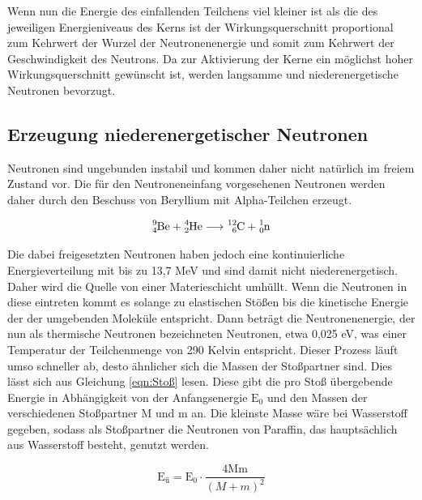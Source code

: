 \documentclass[titlepage = firstcover]{scrartcl}
\begin{document}
                \noindent
                Wenn nun die Energie des einfallenden Teilchens viel kleiner ist als die des jeweiligen Energieniveaus des Kerns ist der Wirkungsquerschnitt proportional zum Kehrwert der Wurzel der
                Neutronenenergie und somit zum Kehrwert der Geschwindigkeit des Neutrons. Da zur Aktivierung der Kerne ein möglichst hoher Wirkungsquerschnitt gewünscht ist, werden langsamme und
                niederenergetische Neutronen bevorzugt.

        
        \subsection{Erzeugung niederenergetischer Neutronen}
            Neutronen sind ungebunden instabil und kommen daher nicht natürlich im freiem Zustand vor. Die für den Neutroneneinfang vorgesehenen Neutronen werden daher durch den Beschuss von 
            Beryllium mit Alpha-Teilchen erzeugt.

            \begin{equation*}
                \ce{^{9}_{4}Be} + \ce{^{4}_{2}He} \longrightarrow \ce{^{12}_{6}C} + \ce{^{1}_{0}n}
            \end{equation*}

            \noindent
            Die dabei freigesetzten Neutronen haben jedoch eine kontinuierliche Energieverteilung mit bis zu 13,7 MeV und sind damit nicht niederenergetisch. Daher wird die Quelle von einer 
            Materieschicht umhüllt. Wenn die Neutronen in diese eintreten kommt es solange zu elastischen Stößen bis die kinetische Energie der der umgebenden Moleküle entspricht. Dann beträgt
            die Neutronenenergie, der nun als thermische Neutronen bezeichneten Neutronen, etwa 0,025 eV, was einer Temperatur der Teilchenmenge von 290 Kelvin entspricht. Dieser Prozess läuft 
            umso schneller ab, desto ähnlicher sich die Massen der Stoßpartner sind. Dies lässt sich aus Gleichung \ref{eqn:Stoß} lesen. Diese gibt die pro Stoß übergebende Energie in Abhängigkeit
            von der Anfangsenergie $\text{E}_0$ und den Massen der verschiedenen Stoßpartner M und m an. Die kleinste Masse wäre bei Wasserstoff gegeben, sodass als Stoßpartner die Neutronen von
            Paraffin, das hauptsächlich aus Wasserstoff besteht, genutzt werden. 

            \begin{equation}
                \text{E}_{\text{ü}} = \text{E}_0 \cdot \frac{4\text{Mm}}{\left(M + m\right)^2}
                \label{eqn:Stoß}
            \end{equation}
\end{document}
